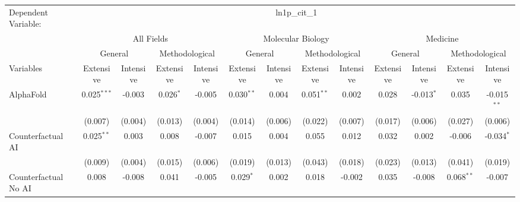 \begingroup
\centering
\begin{tabular}{lcccccccccccc}
   \tabularnewline \midrule \midrule
   Dependent Variable: & \multicolumn{12}{c}{ln1p\_cit\_1}\\
 & \multicolumn{4}{c}{All Fields} & \multicolumn{4}{c}{Molecular Biology} & \multicolumn{4}{c}{Medicine} \\
\cmidrule(lr){2-5} \cmidrule(lr){6-9} \cmidrule(lr){10-13}
 & \multicolumn{2}{c}{General} & \multicolumn{2}{c}{Methodological} & \multicolumn{2}{c}{General} & \multicolumn{2}{c}{Methodological} & \multicolumn{2}{c}{General} & \multicolumn{2}{c}{Methodological} \\
\cmidrule(lr){2-3} \cmidrule(lr){4-5} \cmidrule(lr){6-7} \cmidrule(lr){8-9} \cmidrule(lr){10-11} \cmidrule(lr){12-13}
Variables & \multicolumn{1}{c}{Extensive} & \multicolumn{1}{c}{Intensive} & \multicolumn{1}{c}{Extensive} & \multicolumn{1}{c}{Intensive} & \multicolumn{1}{c}{Extensive} & \multicolumn{1}{c}{Intensive} & \multicolumn{1}{c}{Extensive} & \multicolumn{1}{c}{Intensive} & \multicolumn{1}{c}{Extensive} & \multicolumn{1}{c}{Intensive} & \multicolumn{1}{c}{Extensive} & \multicolumn{1}{c}{Intensive} \\
\cmidrule(lr){1-1}\cmidrule(lr){2-2} \cmidrule(lr){3-3} \cmidrule(lr){4-4} \cmidrule(lr){5-5} \cmidrule(lr){6-6} \cmidrule(lr){7-7} \cmidrule(lr){8-8} \cmidrule(lr){9-9} \cmidrule(lr){10-10} \cmidrule(lr){11-11} \cmidrule(lr){12-12} \cmidrule(lr){13-13}
   AlphaFold                                & 0.025$^{***}$ & -0.003   & 0.026$^{*}$   & -0.005   & 0.030$^{**}$ & 0.004           & 0.051$^{**}$  & 0.002         & 0.028          & -0.013$^{*}$ & 0.035         & -0.015$^{**}$\\   
                                            & (0.007)       & (0.004)  & (0.013)       & (0.004)  & (0.014)      & (0.006)         & (0.022)       & (0.007)       & (0.017)        & (0.006)      & (0.027)       & (0.006)\\   
   Counterfactual AI                        & 0.025$^{**}$  & 0.003    & 0.008         & -0.007   & 0.015        & 0.004           & 0.055         & 0.012         & 0.032          & 0.002        & -0.006        & -0.034$^{*}$\\   
                                            & (0.009)       & (0.004)  & (0.015)       & (0.006)  & (0.019)      & (0.013)         & (0.043)       & (0.018)       & (0.023)        & (0.013)      & (0.041)       & (0.019)\\   
   Counterfactual No AI                     & 0.008         & -0.008   & 0.041         & -0.005   & 0.029$^{*}$  & 0.002           & 0.018         & -0.002        & 0.035          & -0.008       & 0.068$^{**}$  & -0.007\\   

\end{tabular}
